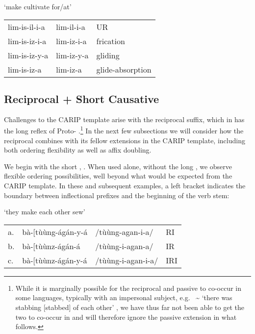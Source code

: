 \documentclass[output=paper,
modfonts
]{LSP/langsci}
\begin{document}
\ea\label{ex:hyman:8}
`make cultivate for/at'\\
\begin{tabular}[t]{@{}lll@{}}
	lim-is-il-i-a & lim-il-i-a & UR \\
	lim-is-iz-i-a & lim-iz-i-a & frication \\
	lim-is-iz-y-a & lim-iz-y-a & gliding \\
	lim-is-iz-a & lim-iz-a & glide-absorption \\
\end{tabular}%
\z

\subsection{Reciprocal + Short Causative}\label{sec:hyman:3.2}

Challenges to the CARIP template arise with the reciprocal suffix, which
in  has the long reflex  of Proto-
.\footnote{While it is marginally possible for the
  reciprocal and passive to co-occur in some  languages, typically
  with an impersonal subject, e.g.\  
  \textasciitilde{}  `there was stabbing
  [stabbed] of each other' \citep[66]{sibanda2004}, we have thus far not
  been able to get the two to co-occur in  and will therefore ignore
  the passive extension in what follows.} In the next few subsections we
will consider how the reciprocal combines with its fellow extensions in
the CARIP template, including both ordering flexibility as well as affix
doubling.

We begin with the short , . When used alone, without
the long , we observe flexible ordering possibilities, well
beyond what would be expected from the CARIP template. In these and
subsequent examples, a left bracket indicates the boundary between
inflectional prefixes and the beginning of the verb stem:

\ea \label{ex:hyman:9} `they make each other sew'\\
\begin{tabular}[t]{@{}llll@{}}
a. & bà-{[}tùùng-ágán-y-á & /tùùng-agan-i-a/ & RI \\
b. & bà-{[}tùùnz-ágán-á & /tùùng-i-agan-a/  & IR \\
c. & bà-{[}tùùnz-ágán-y-á & /tùùng-i-agan-i-a/ & IRI \\
\end{tabular}
\z
\end{document}
